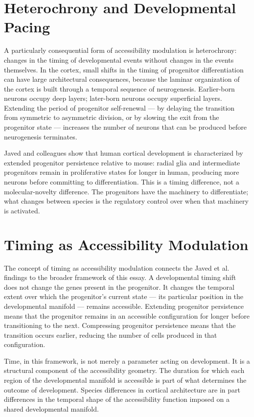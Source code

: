 \documentclass[12pt, a4paper, openany]{book}
\theoremstyle{definition}
\theoremstyle{remark}
\begin{document}
\section{Heterochrony and Developmental Pacing}

A particularly consequential form of accessibility modulation is heterochrony: changes in the timing of developmental events without changes in the events themselves. In the cortex, small shifts in the timing of progenitor differentiation can have large architectural consequences, because the laminar organization of the cortex is built through a temporal sequence of neurogenesis. Earlier-born neurons occupy deep layers; later-born neurons occupy superficial layers. Extending the period of progenitor self-renewal — by delaying the transition from symmetric to asymmetric division, or by slowing the exit from the progenitor state — increases the number of neurons that can be produced before neurogenesis terminates.

Javed and colleagues show that human cortical development is characterized by extended progenitor persistence relative to mouse: radial glia and intermediate progenitors remain in proliferative states for longer in human, producing more neurons before committing to differentiation. This is a timing difference, not a molecular-novelty difference. The progenitors have the machinery to differentiate; what changes between species is the regulatory control over when that machinery is activated.

\section{Timing as Accessibility Modulation}

The concept of timing as accessibility modulation connects the Javed et al. findings to the broader framework of this essay. A developmental timing shift does not change the genes present in the progenitor. It changes the temporal extent over which the progenitor's current state — its particular position in the developmental manifold — remains accessible. Extending progenitor persistence means that the progenitor remains in an accessible configuration for longer before transitioning to the next. Compressing progenitor persistence means that the transition occurs earlier, reducing the number of cells produced in that configuration.

Time, in this framework, is not merely a parameter acting on development. It is a structural component of the accessibility geometry. The duration for which each region of the developmental manifold is accessible is part of what determines the outcome of development. Species differences in cortical architecture are in part differences in the temporal shape of the accessibility function imposed on a shared developmental manifold.
\end{document}
